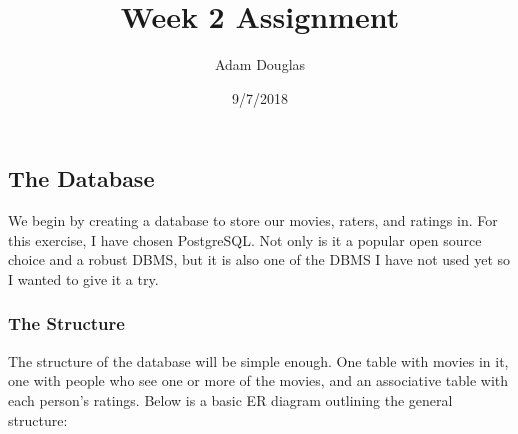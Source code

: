 \documentclass[]{article}
\title{Week 2 Assignment}
\author{Adam Douglas}
\date{9/7/2018}
\begin{document}
\maketitle

\subsection{The Database}\label{the-database}

We begin by creating a database to store our movies, raters, and ratings
in. For this exercise, I have chosen PostgreSQL. Not only is it a
popular open source choice and a robust DBMS, but it is also one of the
DBMS I have not used yet so I wanted to give it a try.

\subsubsection{The Structure}\label{the-structure}

The structure of the database will be simple enough. One table with
movies in it, one with people who see one or more of the movies, and an
associative table with each person's ratings. Below is a basic ER
diagram outlining the general structure:
\end{document}
